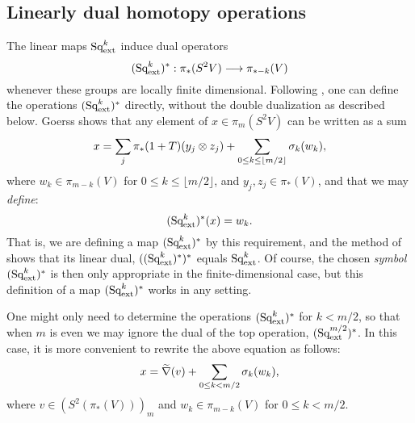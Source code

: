 \documentclass[11pt]{amsart}
\theoremstyle{plain}
\theoremstyle{definition}
\renewcommand{\to}{\longrightarrow}
\newcommand{\calC}{\mathcal{C}}
\theoremstyle{plain}
\newcommand{\ExtCohOp}{\textup{Sq}_\textup{ext}}
\begin{document}
\begin{Constructing (co)homotopy operations}
\begin{shaded}
\end{shaded}

\subsection{Linearly dual homotopy operations}\label{Linearly dual homotopy operations}
The linear maps $\ExtCohOp^k$ induce dual operators
\[(\ExtCohOp^k)^*:\pi_*(S^2V)\to \pi_{*-k}(V)\]
whenever these groups are locally finite dimensional. Following \cite[\S3]{MR1089001}, one can define the operations $(\ExtCohOp^k)^*$ directly, without the double dualization as described below. %
Goerss \cite[Proposition 3.7]{MR1089001}
shows that any element of $x\in \pi_m(S^2V)$ can be written as a sum
\[x=\sum_j\pi_*(1+T)(y_j\otimes z_j)+\sum_{\smash{0\leq k\leq \lfloor m/2\rfloor}}\sigma_k(w_k),\]
where $w_k\in \pi_{m-k}(V)$ for $0\leq k\leq\lfloor m/2\rfloor$, and $y_j,z_j\in \pi_{*}(V)$, and that we may \emph{define}:
\[(\ExtCohOp^k)^*(x)=w_k.\]
That is, we are defining a map $(\ExtCohOp^k)^*$ by this requirement, and the method of \cite[\S3]{MR1089001} shows that its linear dual, $((\ExtCohOp^k)^*)^*$ equals $\ExtCohOp^k$. Of course, the chosen \emph{symbol} $(\ExtCohOp^k)^*$ is then only appropriate in the finite-dimensional case, but this definition of a map $(\ExtCohOp^k)^*$ works in any setting.

One might only need to determine the operations $(\ExtCohOp^k)^*$ for $k<m/2$, so that when $m$ is even we may ignore the dual of the top operation, $(\ExtCohOp^{m/2})^*$. In this case, it is more convenient to rewrite the above equation as follows: 
\[x=\widetilde{\nabla}(v)+\sum_{\smash{0\leq k< m/2}}\sigma_k(w_k),\]
where $v\in(S^2(\pi_*(V)))_{m}$ and $w_k\in \pi_{m-k}(V)$ for $0\leq k<m/2$.



\end{Constructing (co)homotopy operations}
\end{document}
